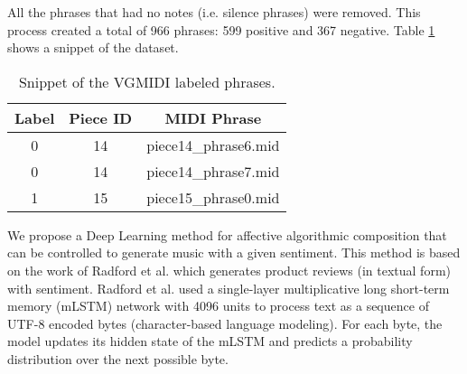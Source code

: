All the phrases that had no notes (i.e. silence phrases)
were removed. This process created a total of 966 phrases: 599 positive
and 367 negative. Table \ref{tab:dataset} shows a snippet of the dataset.

\begin{table}[!h]
 \begin{center}
 \begin{tabular}{ccc}
  \hline
  \textbf{Label} & \textbf{Piece ID} & \textbf{MIDI Phrase} \\
  \hline
     0 & 14 & piece14\_phrase6.mid \\
     0 & 14 & piece14\_phrase7.mid \\
     1 & 15 & piece15\_phrase0.mid \\
  \hline
 \end{tabular}
\end{center}
 \caption{Snippet of the VGMIDI labeled phrases.}
 \label{tab:dataset}
\end{table}

We propose a Deep Learning method for affective algorithmic composition that
can be controlled to generate music with a given sentiment. This method is based on the work of
Radford et al. \cite{radford_2017} which generates product reviews (in textual form) with sentiment.
Radford et al. \cite{radford_2017} used a single-layer multiplicative
long short-term memory (mLSTM) network \cite{krause2017} with 4096 units to process
text as a sequence of UTF-8 encoded bytes (character-based language modeling).
For each byte, the model updates its hidden state of the mLSTM and predicts a
probability distribution over the next possible byte.



